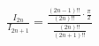 \documentclass[preview]{standalone}
\begin{document}
\begin{align*}
\frac{I_{2n}}{I_{2n+1}} = \frac{\frac{(2n-1)!!}{(2n)!!} \cdot \frac{\pi}{2}}{\frac{(2n)!!}{(2n+1)!!}}
\end{align*}
\end{document}
